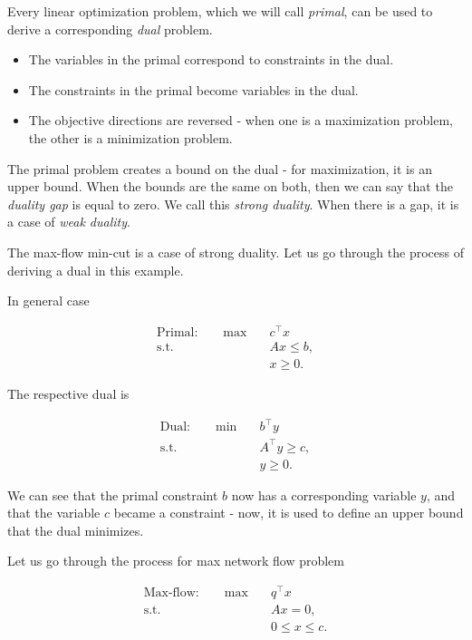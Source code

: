 \documentclass[12pt, openany]{article}
\begin{document}
Every linear optimization problem, which we will call \textit{primal}, can be used to derive a corresponding \textit{dual} problem. 
\begin{itemize}
    \item The variables in the primal correspond to constraints in the dual.
    \item The constraints in the primal become variables in the dual.
    \item The objective directions are reversed - when one is a maximization problem, the other is a minimization problem.
\end{itemize}

The primal problem creates a bound on the dual - for maximization, it is an upper bound. When the bounds are the same on both, then we can say that the \textit{duality gap} is equal to zero. We call this \textit{strong duality}. When there is a gap, it is a case of \textit{weak duality}.

The max-flow min-cut is a case of strong duality. Let us go through the process of deriving a dual in this example.

In general case

\[
\begin{aligned}
\text{Primal:} \qquad
\max \quad & c^\top x \\
\text{s.t.} \quad & Ax \le b, \\
& x \ge 0 .
\end{aligned}
\]

The respective dual is

\[
\begin{aligned}
\text{Dual:} \qquad
\min \quad & b^\top y \\
\text{s.t.} \quad & A^\top y \ge c, \\
& y \ge 0 .
\end{aligned}
\]

We can see that the primal constraint \(b\) now has a corresponding variable \(y\), and that the variable \(c\) became a constraint - now, it is used to define an upper bound that the dual minimizes.

Let us go through the process for max network flow problem

\[
\begin{aligned}
\text{Max-flow:} \qquad
\max \quad & q^\top x \\
\text{s.t.} \quad
& Ax = 0, \\
& 0 \le x \le c .
\end{aligned}
\]
\end{document}
